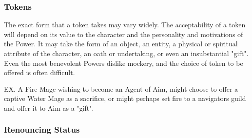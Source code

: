 \subsubsection{Tokens}

The exact form that a token takes may vary widely.  The acceptability
of a token will depend on its value to the character and the
personality and motivations of the Power.  It may take the form of an
object, an entity, a physical or spiritual attribute of the character,
an oath or undertaking, or even an insubstantial "gift".  Even the
most benevolent Powers dislike mockery, and the choice of token to be
offered is often difficult.

EX. A Fire Mage wishing to become an Agent of Aim, might choose to
offer a captive Water Mage as a sacrifice, or might perhaps set fire
to a navigators guild and offer it to Aim as a "gift".

\subsubsection{Renouncing Status}

